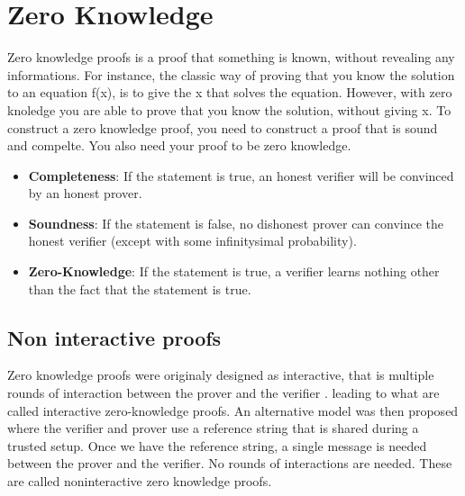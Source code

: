 \section{Zero Knowledge}
Zero knowledge proofs is a proof that something is known, without revealing any informations. For instance,
the classic way of proving that you know the solution to an equation f(x), is to give the x that solves the equation.
However, with zero knoledge you are able to prove that you know the solution, without giving x. 
To construct a zero knowledge proof, you need to construct a proof that is sound and compelte. You also need your proof to be zero knowledge\cite{LZK}.

\begin{itemize}

    \item \textbf{Completeness}: If the statement is true, an honest verifier will be convinced by an honest prover.
    
    \item \textbf{Soundness}: If the statement is false, no dishonest prover can convince the honest verifier (except with some infinitysimal probability).
    
    \item \textbf{Zero-Knowledge}: If the statement is true,  a verifier learns nothing other than the fact that the statement is true. \cite{LC23}
    
    \end{itemize}


    \subsection{Non interactive proofs} 

Zero knowledge proofs were originaly designed as interactive, that is multiple rounds of interaction between the prover and the verifier \cite{GMR89}.
 leading to what are called interactive zero-knowledge proofs. An alternative model was then proposed where the verifier and prover use a 
 reference string that is shared during a trusted setup. Once we have the reference string, a single message is needed between the prover and the verifier.
 No rounds of interactions are needed. These are called noninteractive zero knowledge proofs.  \cite{BFM88} \cite{GMW91}



